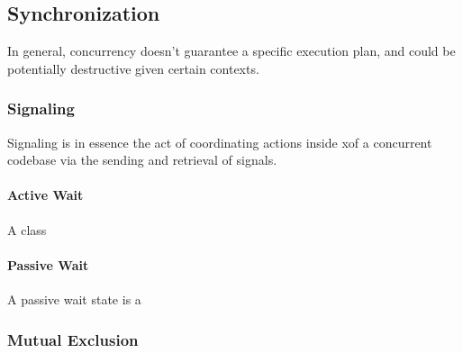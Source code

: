 \documentclass[12pt,a4paper,teal]{bbe}
\begin{document}
	
	\subsection{Synchronization}
	In general, concurrency doesn't guarantee a specific execution plan, and could
	be potentially destructive given certain contexts. 
	\subsubsection{Signaling}
	Signaling is in essence the act of coordinating actions inside xof a 
	concurrent codebase via the sending and retrieval of signals.
	\paragraph{Active Wait}
	A class
	\paragraph{Passive Wait}
	A passive wait state is a 
	\subsubsection{Mutual Exclusion}
	
\end{document}
